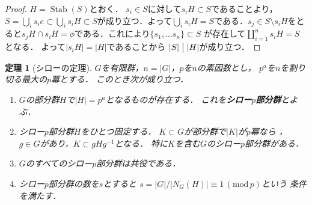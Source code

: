 \documentclass[dvipdfmx,a4paper,12pt]{jsarticle}
\newtheorem{theorem}{定理}[section]
\begin{document}
\begin{proof}
    $H=\operatorname{Stab}(S)$とおく．
    $s_i\in S$に対して$s_iH\subset S$であることより，
    $\displaystyle S=\bigcup_is_ie \subset \bigcup_i
    s_iH\subset S$が成り立つ．よって$\displaystyle \bigcup_i
    s_iH=S$である．$s_j\in S \setminus s_iH$をとると$s_jH\cap
    s_iH=\phi$である．これにより$\{ s_1,\ldots s_n\} \subset S$
    が存在して$\displaystyle\coprod_{i=1}^ns_iH=S$となる．
    よって$\lvert s_iH\rvert=\lvert H\rvert$であることから
    $\lvert S\rvert \bigm| \lvert H \rvert$が成り立つ．
\end{proof}
\begin{theorem}[シローの定理]
    $G$を有限群，$n=|G|$，$p$を$n$の素因数とし，
    $p^a$を$n$を割り切る最大の$p$冪とする．
    このとき次が成り立つ．
    \begin{enumerate}
        \item $G$の部分群$H$で$|H|=p^a$となるものが存在する．
        これを\textbf{シロー$p$部分群}とよぶ．
        \item シロー$p$部分群$H$をひとつ固定する．
        $K\subset G$が部分群で$|K|$が$p$冪なら
        ，$g\in G$があり，$K\subset gHg^{-1}$となる．
        特に$K$を含む$G$のシロー$p$部分群がある．
        \item $G$のすべてのシロー$p$部分群は共役である．
        \item シロー$p$部分群の数を$s$とすると
        $s=|G|/|N_G(H)|\equiv1\,(\mathrm{mod}\,p)$という
        条件を満たす．
    \end{enumerate}
\end{theorem}
\end{document}
